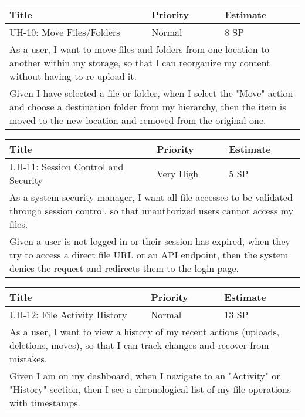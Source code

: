 \vspace{5mm}
\begin{tabular}{|p{4cm}|p{5cm}|p{5cm}|}
    \hline
    \textbf{Title} & \textbf{Priority} & \textbf{Estimate} \\
    \hline
    UH-10: Move Files/Folders & Normal & 8 SP \\
    \hline
    \multicolumn{3}{|p{14cm}|}{As a user, I want to move files and folders from one location to another within my storage, so that I can reorganize my content without having to re-upload it.} \\
    \hline
    \multicolumn{3}{|p{14cm}|}{Given I have selected a file or folder, when I select the "Move" action and choose a destination folder from my hierarchy, then the item is moved to the new location and removed from the original one.} \\
    \hline
\end{tabular}

\vspace{5mm}
\begin{tabular}{|p{4cm}|p{5cm}|p{5cm}|}
    \hline
    \textbf{Title} & \textbf{Priority} & \textbf{Estimate} \\
    \hline
    UH-11: Session Control and Security & Very High & 5 SP \\
    \hline
    \multicolumn{3}{|p{14cm}|}{As a system security manager, I want all file accesses to be validated through session control, so that unauthorized users cannot access my files.} \\
    \hline
    \multicolumn{3}{|p{14cm}|}{Given a user is not logged in or their session has expired, when they try to access a direct file URL or an API endpoint, then the system denies the request and redirects them to the login page.} \\
    \hline
\end{tabular}

\vspace{5mm}
\begin{tabular}{|p{4cm}|p{5cm}|p{5cm}|}
    \hline
    \textbf{Title} & \textbf{Priority} & \textbf{Estimate} \\
    \hline
    UH-12: File Activity History & Normal & 13 SP \\
    \hline
    \multicolumn{3}{|p{14cm}|}{As a user, I want to view a history of my recent actions (uploads, deletions, moves), so that I can track changes and recover from mistakes.} \\
    \hline
    \multicolumn{3}{|p{14cm}|}{Given I am on my dashboard, when I navigate to an "Activity" or "History" section, then I see a chronological list of my file operations with timestamps.} \\
    \hline
\end{tabular}

